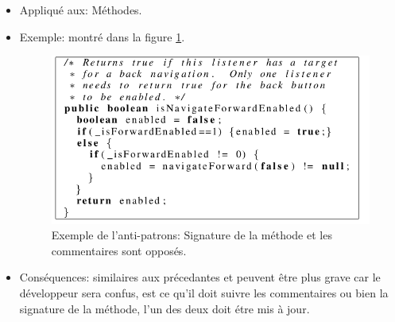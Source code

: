 \begin{enumerate}
\begin{itemize}
\item Appliqué aux: Méthodes.
\item Exemple: montré dans la figure \ref{fig:trois_deux}.
\begin{figure}[H]
	\centering
\includegraphics[width=0.9\linewidth]{Others/Resources/trois_deux.png}
	\caption{Exemple de l'anti-patrons:  Signature de la méthode et les commentaires sont opposés\cite{arnaoudova2013new}.}
		\label{fig:trois_deux}
	\end{figure}
\item Conséquences: similaires aux précedantes et peuvent être plus grave car le développeur sera confus, est ce qu’il doit suivre les commentaires ou bien la signature de la méthode, l’un des deux doit étre mis à jour.
\end{itemize}
\end{enumerate}
